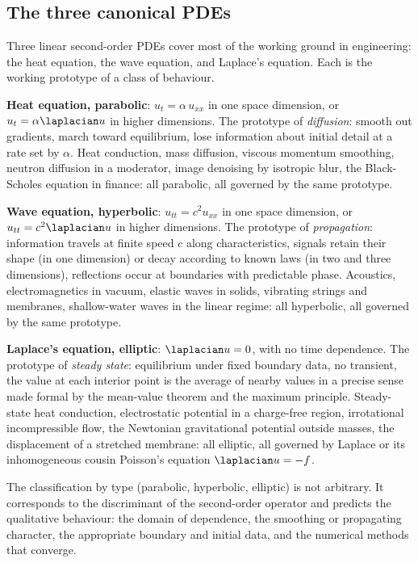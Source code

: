 \subsection{The three canonical PDEs}

Three linear second-order PDEs cover most of the working ground in
engineering: the heat equation, the wave equation, and Laplace's
equation. Each is the working prototype of a class of behaviour.

\textbf{Heat equation, parabolic}: $u_{t} = \alpha \, u_{xx}$ in
one space dimension, or $u_{t} = \alpha \laplacian u$ in higher
dimensions. The prototype of \textit{diffusion}: smooth out
gradients, march toward equilibrium, lose information about
initial detail at a rate set by $\alpha$. Heat conduction, mass
diffusion, viscous momentum smoothing, neutron diffusion in a
moderator, image denoising by isotropic blur, the Black-Scholes
equation in finance: all parabolic, all governed by the same
prototype.

\textbf{Wave equation, hyperbolic}: $u_{tt} = c^{2} u_{xx}$ in one
space dimension, or $u_{tt} = c^{2} \laplacian u$ in higher
dimensions. The prototype of \textit{propagation}: information
travels at finite speed $c$ along characteristics, signals retain
their shape (in one dimension) or decay according to known laws
(in two and three dimensions), reflections occur at boundaries
with predictable phase. Acoustics, electromagnetics in vacuum,
elastic waves in solids, vibrating strings and membranes,
shallow-water waves in the linear regime: all hyperbolic, all
governed by the same prototype.

\textbf{Laplace's equation, elliptic}: $\laplacian u = 0$, with
no time dependence. The prototype of \textit{steady state}:
equilibrium under fixed boundary data, no transient, the value at
each interior point is the average of nearby values in a precise
sense made formal by the mean-value theorem and the maximum
principle. Steady-state heat conduction, electrostatic potential
in a charge-free region, irrotational incompressible flow, the
Newtonian gravitational potential outside masses, the
displacement of a stretched membrane: all elliptic, all governed
by Laplace or its inhomogeneous cousin Poisson's equation
$\laplacian u = -f$.

The classification by type (parabolic, hyperbolic, elliptic) is
not arbitrary. It corresponds to the discriminant of the
second-order operator and predicts the qualitative behaviour: the
domain of dependence, the smoothing or propagating character, the
appropriate boundary and initial data, and the numerical methods
that converge.

